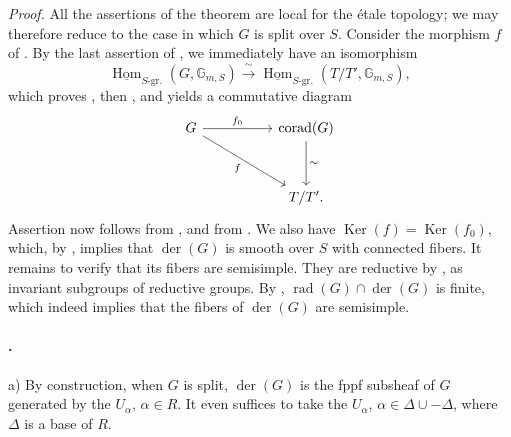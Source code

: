\textit{Proof.}
All the assertions of the theorem are local for the étale
topology; we may therefore reduce to the case in which \(G\) is
split over \(S\). Consider the morphism \(f\) of . By the
last assertion of , we immediately have an isomorphism
\[
  \underline{\operatorname{Hom}}_{S\text{-gr.}}
    (G,\mathbb G_{m,S})
  \xrightarrow{\ \sim\ }
  \underline{\operatorname{Hom}}_{S\text{-gr.}}
    (T/T',\mathbb G_{m,S}),
\]
which proves \textup{}, then \textup{}, and yields a
commutative diagram
\[
\begin{tikzcd}[column sep=5.0em,row sep=3.2em]
  G
    \arrow[r,"f_0"]
    \arrow[dr,"f"']
  &
  \operatorname{corad}(G)
    \arrow[d,"\sim"]
  \\
  &
  T/T'.
\end{tikzcd}


\]
Assertion \textup{} now follows from , and
\textup{} from . We also have
\(\operatorname{Ker}(f)=\operatorname{Ker}(f_0)\), which, by
, implies that \(\operatorname{der}(G)\) is smooth over
\(S\) with connected fibers. It remains to verify that its fibers
are semisimple. They are reductive by , as invariant
subgroups of reductive groups. By \textup{},
\(\operatorname{rad}(G)\cap\operatorname{der}(G)\) is finite,
which indeed implies that the fibers of \(\operatorname{der}(G)\)
are semisimple.

\paragraph{.}
\textup{a)} By construction, when \(G\) is split,
\(\operatorname{der}(G)\) is the fppf subsheaf of \(G\) generated
by the \(U_\alpha\), \(\alpha\in R\). It even suffices to take the
\(U_\alpha\), \(\alpha\in\Delta\cup-\Delta\), where \(\Delta\) is
a base of \(R\).

